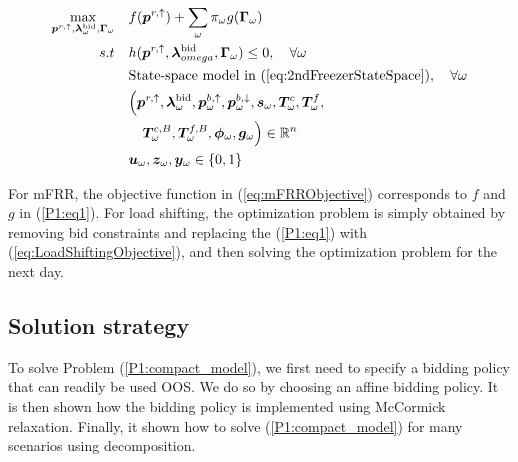 \begin{subequations}\label{P1:compact_model}
    \begin{align}
        \underset{\bm{p}^{r,\uparrow}, \bm{\lambda}_{\omega}^{\text{bid}}, \bm{\Gamma}_{\omega}}{\textrm{max}} \quad & f(\bm{p}^{r,\uparrow}) + \sum_{\omega} \pi_{\omega} g(\bm{\Gamma}_{\omega}) \label{P1:eq1}
        \\
        s.t \quad                                                                                                    & h(\bm{p}^{r,\uparrow}, \bm{\lambda}_{omega}^{\text{bid}}, \bm{\Gamma}_{\omega}) \leq 0, \quad \forall{\omega}\label{P1:eq2}                                                                     \\
        \quad                                                                                                        & \text{State-space model in } (\ref{eq:2ndFreezerStateSpace}), \quad \forall{\omega} \label{P1:eq3}
        \\
        \quad                                                                                                        & \Bigl( \bm{p}^{r,\uparrow}, \bm{\lambda}_{\omega}^{\text{bid}}, \bm{p}_{\omega}^{b,\uparrow}, \bm{p}_{\omega}^{b,\downarrow}, \bm{s}_{\omega}, \bm{T}_{\omega}^{c}, \bm{T}_{\omega}^{f}, \notag \\ \quad & \quad \bm{T}_{\omega}^{c, B}, \bm{T}_{\omega}^{f,B}, \bm{\phi}_{\omega}, \bm{g}_{\omega} \Bigr) \in \mathbb{R}^{n}  \label{P1:eq4}
        \\
        \quad                                                                                                        & \bm{u}_{\omega}, \bm{z}_{\omega}, \bm{y}_{\omega} \in \{0,1\}  \label{P1:eq5}
    \end{align}
\end{subequations}

For mFRR, the objective function in (\ref{eq:mFRRObjective}) corresponds to $f$ and $g$ in (\ref{P1:eq1}). For load shifting, the optimization problem is simply obtained by removing bid constraints and replacing the (\ref{P1:eq1}) with (\ref{eq:LoadShiftingObjective}), and then solving the optimization problem for the next day.


\subsection{Solution strategy}\label{sec:solution_strategy}

To solve Problem (\ref{P1:compact_model}), we first need to specify a bidding policy that can readily be used OOS. We do so by choosing an affine bidding policy. It is then shown how the bidding policy is implemented using McCormick relaxation. Finally, it shown how to solve (\ref{P1:compact_model}) for many scenarios using decomposition.

